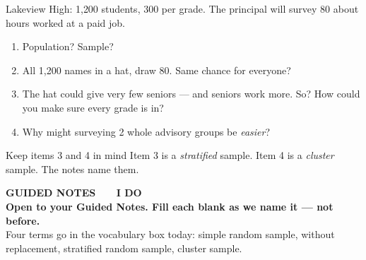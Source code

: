 \documentclass[aspectratio=169, 11pt]{beamer}
\begin{document}
\begin{frame}[t, plain]
  Lakeview High: 1{,}200 students, 300 per grade. The principal will survey 80 about hours
  worked at a paid job.
  \begin{enumerate}\setlength{\itemsep}{6pt}
    \item Population? Sample?
    \item All 1{,}200 names in a hat, draw 80. Same chance for everyone?
    \item The hat could give very few seniors --- and seniors work more. So? How could you make
          sure every grade is in?
    \item Why might surveying 2 whole advisory groups be \emph{easier}?
  \end{enumerate}
  \begin{block}{Keep items 3 and 4 in mind}
    Item 3 is a \emph{stratified} sample. Item 4 is a \emph{cluster} sample. The notes name
    them.
  \end{block}
\end{frame}

{
\begin{frame}[plain]
  \vspace{1.8cm}\hspace{0.8cm}%
  \begin{minipage}{0.86\textwidth}
    {\color{goldacc}\bfseries\small GUIDED NOTES \ \textbullet\ \ I DO}\\[0.7cm]
    {\color{white}\bfseries\Large Open to your Guided Notes. Fill each blank as we name it
    --- not before.}\\[0.9cm]
    {\color{skymid}\small Four terms go in the vocabulary box today: simple random sample,
    without replacement, stratified random sample, cluster sample.}
  \end{minipage}
\end{frame}
}
\end{document}
